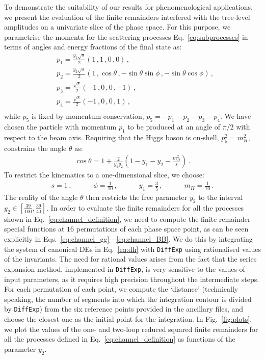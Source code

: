 \documentclass[main.tex]{subfiles}
\begin{document}
To demonstrate the suitability of our results for phenomenological applications, we present the evaluation of the finite remainders interfered with the tree-level amplitudes on a univariate slice of the phase space. For this purpose, we parametrise the momenta for the scattering processes Eq.~\ref{eq:subprocesses} in terms of angles and energy fractions of the final state as:
\begin{equation} \label{eq:parametrisation}
\begin{aligned}
& p_1 = \frac{y_1 \sqrt{s}}{2} \left( 1\,, 1\,, 0\,, 0 \right) \,, \quad \\
& p_2 = \frac{y_2 \sqrt{s}}{2} \left( 1\,, \cos\theta\,, -\sin\theta \sin\phi \,, -\sin\theta \cos\phi \right) \,,  \\
& p_3 = \frac{\sqrt{s}}{2} \left(-1\,,0\,, 0 \,, -1 \right) \,,  \\
& p_4 = \frac{\sqrt{s}}{2} \left(-1\,,0\,, 0 \,, 1 \right) \,,  \\
\end{aligned}
\end{equation}
while $p_5$ is fixed by momentum conservation, $p_5 = -p_1-p_2-p_3-p_4$. We have chosen the particle with momentum $p_1$ to be produced at an angle of $\pi/2$ with respect to the beam axis.
Requiring that the Higgs boson is on-shell, $p_5^2 = m_H^2$, constrains the angle $\theta$ as:
\begin{align}
\cos\theta = 1+\frac{2}{y_1 y_2}\left(1-y_1-y_2-\frac{m_H^2}{s} \right)\,.
\end{align}
To restrict the kinematics to a one-dimensional slice, we choose:
\begin{align} \label{eq:fixparameters}
s = 1 \,, \quad \qquad \phi = \frac{1}{10} \,, \quad \qquad y_1 = \frac{3}{5} \,, \quad \qquad m_H = \frac{1}{10} \,.
\end{align}
The reality of the angle $\theta$ then restricts the free parameter $y_2$ to the interval $y_2 \in
[\frac{39}{100},\frac{39}{40}]$. In order to evaluate the finite remainders for all the processes
shown in Eq.~\ref{eq:channel_definition}, we need to compute the finite remainder special functions
at $16$ permutations of each phase space point, as can be seen explicitly in
Eqs.~\ref{eq:channel_gg}---\ref{eq:channel_BB}. We do this by integrating the system of canonical DEs in Eq.~\ref{eq:dh} with \texttt{DiffExp} using rationalised values of the invariants. The need for rational values arises from the fact that the series expansion method, implemented in \texttt{DiffExp}, is very sensitive to the values of input parameters, as it requires high precision throughout the intermediate steps. For each permutation of each point, we compute the `distance' (technically speaking, the number of segments into which the integration contour is divided by \texttt{DiffExp}) from the six reference points provided in the ancillary files, and choose the closest one as the initial point for the integration. In Fig.~\ref{fig:plots}, we plot the values of the one- and two-loop reduced squared finite remainders for all the processes defined in Eq.~\ref{eq:channel_definition} as functions of the parameter $y_2$.
\end{document}
